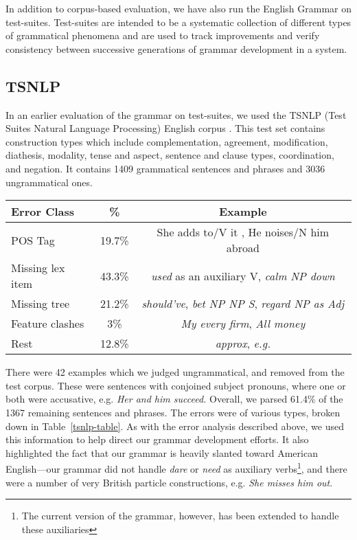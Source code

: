 In addition to corpus-based evaluation, we have also run the English
Grammar on test-suites. Test-suites are intended to be a systematic
collection of different types of grammatical phenomena and are used to
track improvements and verify consistency between successive generations of
grammar development in a system.

\subsection{TSNLP}

In an earlier evaluation of the grammar on test-suites, we used the TSNLP
(Test Suites Natural Language Processing) English corpus
\cite{Lehmann96}. This test set contains construction types which include
complementation, agreement, modification, diathesis, modality, tense and
aspect, sentence and clause types, coordination, and negation. It contains
1409 grammatical sentences and phrases and 3036 ungrammatical ones.

\begin{table*}[htb]
\centering
\begin{tabular}{|l|c|c|}
\hline
Error Class & \% & Example \\ \hline
POS Tag &  19.7\% & She adds  to/V it , He noises/N him abroad \\ \hline
Missing lex item & 43.3\% & {\it used} as an auxiliary V, {\it calm NP down} \\ \hline
Missing tree & 21.2\% & {\it should've}, {\it bet NP NP S}, {\it
regard NP as Adj} \\ \hline
Feature clashes & 3\% & {\it My every firm}, {\it All money} \\ \hline
Rest&12.8\% & {\it approx}, {\it e.g.} \\
\hline
\end{tabular}
\caption{Breakdown of TSNLP Errors}
\label{tsnlp-table}
\end{table*} 

There were 42 examples which we judged ungrammatical, and removed from
the test corpus. These were sentences with conjoined subject pronouns,
where one or both were accusative, e.g. {\it Her and him succeed.}
Overall, we parsed 61.4\% of the 1367 remaining sentences and
phrases. The errors were of various types, broken down in
Table~\ref{tsnlp-table}. As with the error analysis described above,
we used this information to help direct our grammar development
efforts. It also highlighted the fact
that our grammar is heavily slanted toward American English---our
grammar did not handle {\it dare} or {\it need} as auxiliary
verbs\footnote{%
%
The current version of the grammar, however, has been extended to handle
these auxiliaries%
%
},
and there were a number of very British particle constructions,
e.g. {\it She misses him out}.

